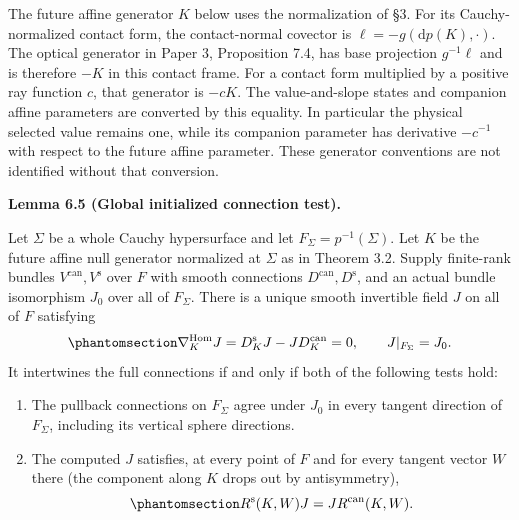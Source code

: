 \documentclass[
  english,
  11pt,
  reqno]{amsart}
\makeatletter
\newcommand{\pandocstatementheading}[1]{%
  \par\addpenalty{\@beginparpenalty}%
  \addvspace{.5\baselineskip plus .2\baselineskip minus .2\baselineskip}%
  {\normalfont\bfseries #1\par}%
  \nobreak\@afterindenttrue\@afterheading
}
\makeatother
\begin{document}
The future affine generator \(K\) below uses the normalization of §3.
For its Cauchy-normalized contact form, the contact-normal covector is
\(\ell=-g(\mathrm dp(K),\cdot)\). The optical generator in Paper 3,
Proposition 7.4, has base projection \(g^{-1}\ell\) and is therefore
\(-K\) in this contact frame. For a contact form multiplied by a
positive ray function \(c\), that generator is \(-cK\). The
value-and-slope states and companion affine parameters are converted by
this equality. In particular the physical selected value remains one,
while its companion parameter has derivative \(-c^{-1}\) with respect to
the future affine parameter. These generator conventions are not
identified without that conversion.

\pandocstatementheading{\protect{}\label{lem:global-initialized-finite-rank-normalization}Lemma 6.5 (Global initialized connection test).}

Let \(\Sigma\) be a whole Cauchy hypersurface and let
\(F_\Sigma=p^{-1}(\Sigma)\). Let \(K\) be the future affine null
generator normalized at \(\Sigma\) as in Theorem 3.2. Supply finite-rank
bundles \(V^{\mathrm{can}},V^{\mathrm{s}}\) over \(F\) with smooth
connections \(D^{\mathrm{can}},D^{\mathrm{s}}\), and an actual bundle
isomorphism \(J_0\) over all of \(F_\Sigma\). There is a unique smooth
invertible field \(J\) on all of \(F\) satisfying
\begin{equation}\protect\phantomsection\label{eq:global-initialized-finite-rank-transport}{
\nabla^{\operatorname{Hom}}_KJ
=D^{\mathrm{s}}_KJ-JD^{\mathrm{can}}_K=0,
\qquad J|_{F_\Sigma}=J_0.
}\end{equation} It intertwines the full connections if and only if both
of the following tests hold:

\begin{enumerate}
\item
  The pullback connections on \(F_\Sigma\) agree under \(J_0\) in every
  tangent direction of \(F_\Sigma\), including its vertical sphere
  directions.
\item
  The computed \(J\) satisfies, at every point of \(F\) and for every
  tangent vector \(W\) there (the component along \(K\) drops out by
  antisymmetry),
  \begin{equation}\protect\phantomsection\label{eq:global-finite-rank-curvature-test}{
  R^{\mathrm{s}}(K,W)J=JR^{\mathrm{can}}(K,W).
  }\end{equation}
\end{enumerate}
\end{document}
